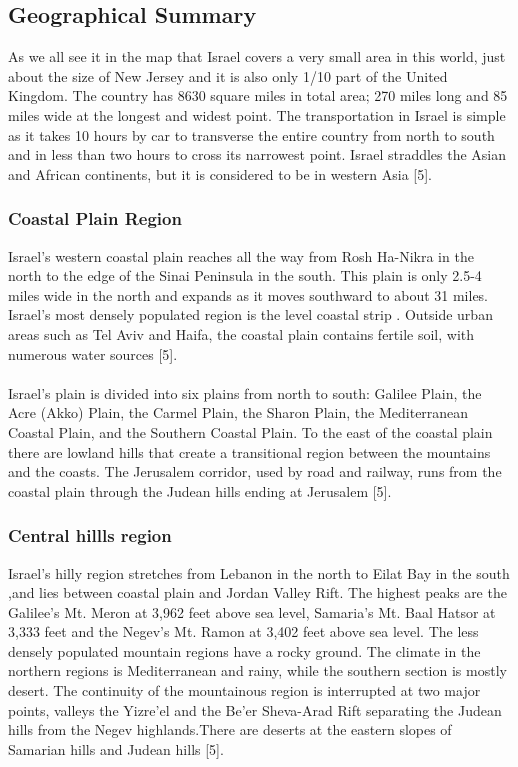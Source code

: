 \documentclass[10pt]{article}
\begin{document}
\subsection{Geographical Summary}
As we all see it in the map that Israel covers a very small area in this world, just about the size of
New Jersey and it is also only 1/10 part of the United Kingdom. The country has 8630 square miles
in total area; 270 miles long and 85 miles wide at the longest and widest point. The transportation
in Israel is simple as it takes 10 hours by car to transverse the entire country from north to south and
in less than two hours to cross its narrowest point. Israel straddles the Asian and African continents,
but it is considered to be in western Asia [5].

\subsubsection{Coastal Plain Region}
Israel's western coastal plain reaches all the way from Rosh Ha-Nikra in the north to the edge of the
Sinai Peninsula in the south. This plain is only 2.5-4 miles wide in the north and expands as it
moves southward to about 31 miles. Israel's most densely populated region is the level coastal strip .
Outside urban areas such as Tel Aviv and Haifa, the coastal plain contains fertile soil, with numerous
water sources [5].
\\
\\
Israel’s plain is divided into six plains from north to south: Galilee Plain, the Acre (Akko) Plain, the Carmel Plain, the Sharon Plain, the Mediterranean Coastal Plain, and the Southern Coastal Plain. To the east of the coastal plain there are lowland hills that create a transitional region between the mountains and the coasts. The Jerusalem corridor, used by road and railway, runs from the coastal plain through the Judean hills ending at Jerusalem [5].

\subsubsection{Central hillls region}
Israel's hilly region stretches from Lebanon in the north to Eilat Bay in the south ,and lies between coastal plain and Jordan Valley Rift. The highest peaks are the Galilee's Mt. Meron at 3,962 feet above sea level, Samaria's Mt. Baal Hatsor at 3,333 feet and the Negev's Mt. Ramon at 3,402 feet above sea level. The less densely populated mountain regions have a rocky ground. The climate in the northern regions is Mediterranean and rainy, while the southern section is mostly desert. The continuity of the mountainous region is interrupted at two major points, valleys the Yizre'el and the Be'er Sheva-Arad Rift separating the Judean hills from the Negev highlands.There are deserts at the eastern slopes of Samarian hills and Judean hills [5].
\end{document}
